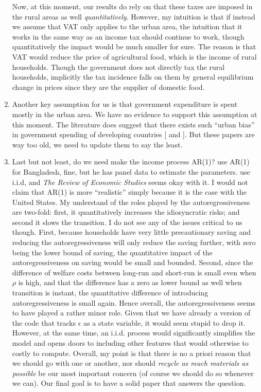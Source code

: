 \documentclass[twoside,11pt,leqno]{article}
\begin{document}
\begin{enumerate}
    Now, at this moment, our results do rely on that these taxes are imposed in the rural areas as well \textit{quantitatively}. However, my intuition is that if instead we assume that VAT only applies to the urban area, the intuition that it works in the same way as an income tax should continue to work, though quantitatively the impact would be much smaller for sure. The reason is that VAT would reduce the price of agricultural food, which is the income of rural households. Though the government does not directly tax the rural households, implicitly the tax incidence falls on them by general equilibrium change in prices since they are the supplier of domestic food.

    \item
    Another key assumption for us is that government expenditure is spent mostly in the urban area. We have no evidence to support this assumption at this moment. The literature does suggest that there exists such ``urban bias'' in government spending of developing countries [\citet{EasterlyRebelo:1993} and \citet{Devarajanetal:1996}]. But these papers are way too old, we need to update them to say the least.

    \item
    Last but not least, do we need make the income process AR(1)? \citet{Lagakosetal:2017} use AR(1) for Bangladesh, fine, but he has panel data to estimate the parameters. \citet{Donovan:2014} use i.i.d, and \textit{The Review of Economic Studies} seems okay with it. I would not claim that AR(1) is more ``realistic'' simply because it is the case with the United States. My understand of the roles played by the autoregressiveness are two-fold: first, it quantitatively increases the idiosyncratic risks; and second it slows the transition. I do not see any of the issues critical to us though. First, because households have very little precautionary saving and reducing the autoregressiveness will only reduce the saving further, with zero being the lower bound of saving, the quantitative impact of the autoregressiveness on saving would be small and bounded. Second, since the difference of welfare costs between long-run and short-run is small even when $\rho$ is high, and that the difference has a zero as lower bound as well when transition is instant, the quantitative difference of introducing autoregressiveness is small again. Hence overall, the autoregressiveness seems to have played a rather minor role. Given that we have already a version of the code that tracks $\epsilon$ as a state variable, it would seem stupid to drop it. However, at the same time, an i.i.d. process would significantly simplifies the model and opens doors to including other features that would otherwise to costly to compute. Overall, my point is that there is no a priori reason that we should go with one or another, nor should \textit{recycle as much materials as possible} be our most important concern (of course we should do so whenever we can). Our final goal is to have a solid paper that answers the question.
\end{enumerate}
\end{document}

